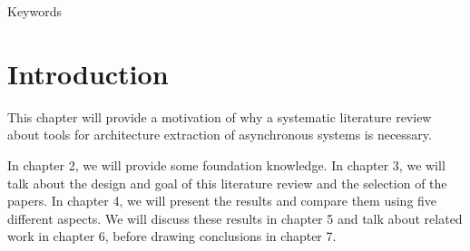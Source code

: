 
Keywords

\section{Introduction}
\label{cha:Introduction}
This chapter will provide a motivation of why a systematic literature review about tools for architecture extraction of asynchronous systems is necessary.

In chapter 2, we will provide some foundation knowledge.
In chapter 3, we will talk about the design and goal of this literature review and the selection of the papers.
In chapter 4, we will present the results and compare them using five different aspects.
We will discuss these results in chapter 5 and talk about related work in chapter 6, before drawing conclusions in chapter 7.


